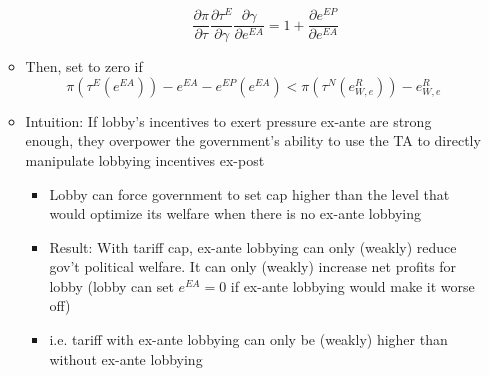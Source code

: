 \documentclass[12pt]{article}
\newcommand{\ga}{\gamma}
\begin{document}
\begin{itemize}
\begin{itemize}
\begin{itemize}
\begin{equation}
							  \frac{\partial \pi}{\partial \tau} \frac{\partial \tau^E}{\partial \ga} \frac{\partial \ga}{\partial e^{EA}} = 1 +\frac{\partial e^{EP}}{\partial e^{EA}}
								\label{eq:ea}
							\end{equation}
					\end{itemize}
			\item Then, set to zero if
			  \begin{equation}
				  \pi(\tau^E(e^{EA})) - e^{EA} - e^{EP}(e^{EA}) < \pi(\tau^N(e^R_{W,e})) - e^R_{W,e} 
					\label{ine:ea}
				\end{equation}
			\item Intuition: If lobby's incentives to exert pressure ex-ante are strong enough, they overpower the government's ability to use the TA to directly manipulate lobbying incentives ex-post
				\begin{itemize}
					\item Lobby can force government to set cap higher than the level that would optimize its welfare when there is no ex-ante lobbying
					\item Result: With tariff cap, ex-ante lobbying can only (weakly) reduce gov't political welfare. It can only (weakly) increase net profits for lobby (lobby can set $e^{EA}=0$ if ex-ante lobbying would make it worse off)
					\item i.e. tariff with ex-ante lobbying can only be (weakly) higher than without ex-ante lobbying
				\end{itemize}	
		\end{itemize}	
\end{itemize}	
				
\end{document}
